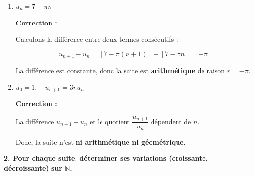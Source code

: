 \documentclass{article}
\begin{document}
\begin{enumerate}[label=\alph*)]
Donc, la suite n'est \textbf{ni arithmétique ni géométrique}.

\bigskip

\item \( u_n = 7 - \pi n \)

\textbf{Correction :}

Calculons la différence entre deux termes consécutifs :

\[ u_{n+1} - u_n = [7 - \pi(n+1)] - [7 - \pi n] = -\pi \]

La différence est constante, donc la suite est \textbf{arithmétique} de raison \( r = -\pi \).

\bigskip

\item \( u_0 = 1, \quad u_{n+1} = 3n u_n \)

\textbf{Correction :}

La différence \( u_{n+1} - u_n \) et le quotient \( \dfrac{u_{n+1}}{u_n} \) dépendent de \( n \).

Donc, la suite n'est \textbf{ni arithmétique ni géométrique}.

\end{enumerate}

\bigskip

\textbf{2. Pour chaque suite, déterminer ses variations (croissante, décroissante) sur \( \mathbb{N} \).}
\end{document}
